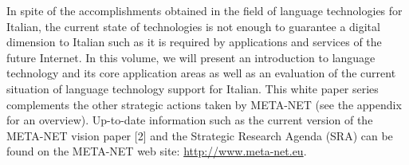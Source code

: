 \begin{multicols}{2}
In spite of the accomplishments obtained in the field of language technologies for Italian, the current state of technologies is not enough to guarantee a digital dimension to Italian such as it is required by applications and services of the future Internet.  In this volume, we will present an introduction to language technology and its core application areas as well as an evaluation of the current situation of language technology support for Italian.  This white paper series complements the other strategic actions taken by META-NET (see the appendix for an overview). Up-to-date information such as the current version of the META-NET vision paper [2] and the Strategic Research Agenda (SRA) can be found on the META-NET web site: \url{http://www.meta-net.eu}.
\end{multicols}

\clearpage


